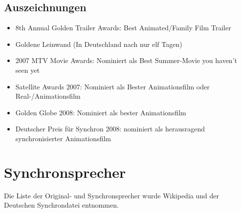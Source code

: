 \begin{appendix}
\subsection{Auszeichnungen}\label{SimpsonsFilmAuszeichnungen}
\begin{itemize}
	\item 8th Annual Golden Trailer Awards: Best Animated/Family Film Trailer
	\item Goldene Leinwand (In Deutschland nach nur elf Tagen)
	\item 2007 MTV Movie Awards: Nominiert als Best Summer-Movie you haven't seen yet
	\item Satellite Awards 2007: Nominiert als Bester Animationsfilm oder Real-/Animationsfilm
	\item Golden Globe 2008: Nominiert als bester Animationsfilm
	\item Deutscher Preis für Synchron 2008: nominiert als herausragend synchronisierter Animationsfilm
\end{itemize}


\section{Synchronsprecher}\label{Synchronsprecher}
Die Liste der Original- und Synchronsprecher wurde Wikipedia \cite{Sprecherliste} und der Deutschen Synchrondatei \cite {Synchronkartei} entnommen.



\end{appendix}
